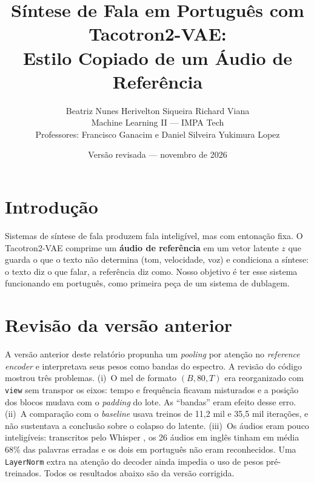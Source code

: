 \documentclass[twocolumn,a4paper,10pt]{article}
\title{\vspace{-1.2cm}\Large\textbf{Síntese de Fala em Português com Tacotron2-VAE:\\ Estilo Copiado de um Áudio de Referência}}
\author{\normalsize Beatriz Nunes \quad Herivelton Siqueira \quad Richard Viana\\[2pt]
\small Machine Learning II --- IMPA Tech\\
\small Professores: Francisco Ganacim e Daniel Silveira Yukimura Lopez}
\date{\small Versão revisada --- novembro de 2026}
\begin{document}

\section{Introdução}
Sistemas de síntese de fala produzem fala inteligível, mas com entonação fixa. O Tacotron2-VAE \cite{hsu,zhang} comprime um \textbf{áudio de referência} em um vetor latente $z$ que guarda o que o texto não determina (tom, velocidade, voz) e condiciona a síntese: o texto diz o que falar, a referência diz como. Nosso objetivo é ter esse sistema funcionando em português, como primeira peça de um sistema de dublagem.

\section{Revisão da versão anterior}
A versão anterior deste relatório propunha um \textit{pooling} por atenção no \textit{reference encoder} e interpretava seus pesos como bandas do espectro. A revisão do código mostrou três problemas. (i)~O mel de formato $(B, 80, T)$ era reorganizado com \texttt{view} sem transpor os eixos: tempo e frequência ficavam misturados e a posição dos blocos mudava com o \textit{padding} do lote. As ``bandas'' eram efeito desse erro. (ii)~A comparação com o \textit{baseline} usava treinos de 11,2 mil e 35,5 mil iterações, e não sustentava a conclusão sobre o colapso do latente. (iii)~Os áudios eram pouco inteligíveis: transcritos pelo Whisper \cite{whisper}, os 26 áudios em inglês tinham em média 68\% das palavras erradas e os dois em português não eram reconhecidos. Uma \texttt{LayerNorm} extra na atenção do decoder ainda impedia o uso de pesos pré-treinados. Todos os resultados abaixo são da versão corrigida.
\end{document}
